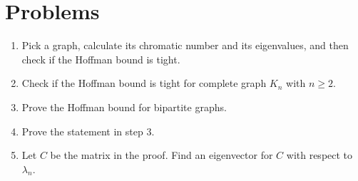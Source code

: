 \documentclass{article}
\theoremstyle{definition}
\begin{document}
\section*{Problems}
\begin{enumerate}
\setlength\itemsep{2em}
\item Pick a graph, calculate its chromatic number and its eigenvalues, and then check if the Hoffman bound is tight.   
\item Check if the Hoffman bound is tight for complete graph $K_n$ with $n\geq 2$.  
\item Prove the Hoffman bound for bipartite graphs. 
\item Prove the statement in step 3.
\item Let $C$ be the matrix in the proof.  Find an eigenvector for $C$ with respect to $\lambda_n$.
\end{enumerate}

\end{document}
